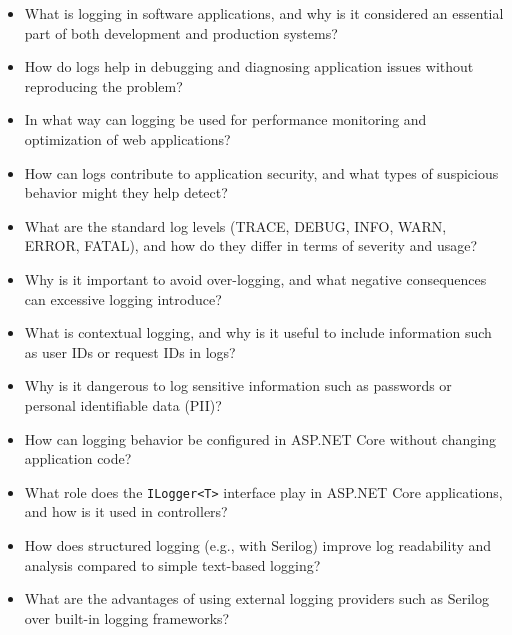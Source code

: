 \begin{itemize}

\item What is logging in software applications, and why is it considered an essential part of both development and production systems?

\item How do logs help in debugging and diagnosing application issues without reproducing the problem?

\item In what way can logging be used for performance monitoring and optimization of web applications?

\item How can logs contribute to application security, and what types of suspicious behavior might they help detect?

\item What are the standard log levels (TRACE, DEBUG, INFO, WARN, ERROR, FATAL), and how do they differ in terms of severity and usage?

\item Why is it important to avoid over-logging, and what negative consequences can excessive logging introduce?

\item What is contextual logging, and why is it useful to include information such as user IDs or request IDs in logs?

\item Why is it dangerous to log sensitive information such as passwords or personal identifiable data (PII)?

\item How can logging behavior be configured in ASP.NET Core without changing application code?

\item What role does the \texttt{ILogger<T>} interface play in ASP.NET Core applications, and how is it used in controllers?

\item How does structured logging (e.g., with Serilog) improve log readability and analysis compared to simple text-based logging?

\item What are the advantages of using external logging providers such as Serilog over built-in logging frameworks?

\end{itemize}
